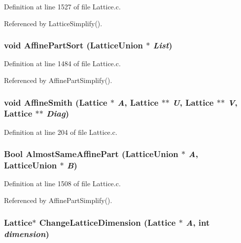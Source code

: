 Definition at line 1527 of file Lattice.c.

Referenced by Lattice\-Simplify().

\subsubsection{\setlength{\rightskip}{0pt plus 5cm}void Affine\-Part\-Sort (Lattice\-Union $\ast$ {\em List})\hspace{0.3cm}{\tt  [static]}}\label{Lattice_8c_a32}




Definition at line 1484 of file Lattice.c.

Referenced by Affine\-Part\-Simplify().

\subsubsection{\setlength{\rightskip}{0pt plus 5cm}void Affine\-Smith (Lattice $\ast$ {\em A}, Lattice $\ast$$\ast$ {\em U}, Lattice $\ast$$\ast$ {\em V}, Lattice $\ast$$\ast$ {\em Diag})}\label{Lattice_8c_a9}




Definition at line 204 of file Lattice.c.
\subsubsection{\setlength{\rightskip}{0pt plus 5cm}Bool Almost\-Same\-Affine\-Part (Lattice\-Union $\ast$ {\em A}, Lattice\-Union $\ast$ {\em B})\hspace{0.3cm}{\tt  [static]}}\label{Lattice_8c_a33}




Definition at line 1508 of file Lattice.c.

Referenced by Affine\-Part\-Simplify().

\subsubsection{\setlength{\rightskip}{0pt plus 5cm}Lattice$\ast$ Change\-Lattice\-Dimension (Lattice $\ast$ {\em A}, int {\em dimension})}\label{Lattice_8c_a13}




